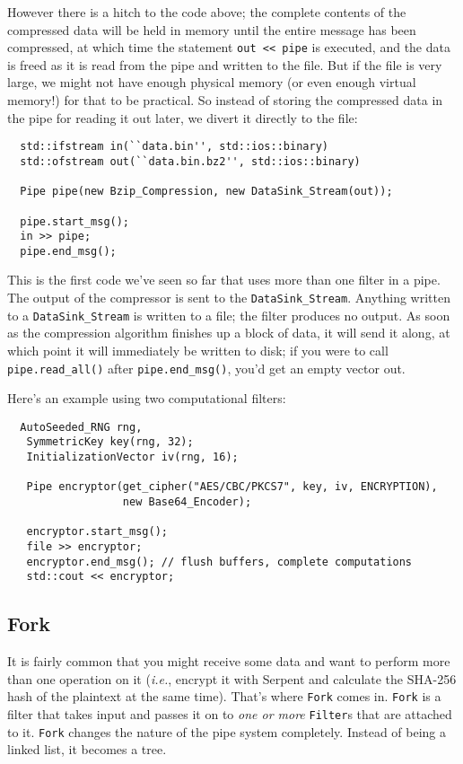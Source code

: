 \documentclass{article}
\newcommand{\type}[1]{\texttt{#1}}
\newcommand{\ie}[0]{\emph{i.e.}}
\begin{document}
However there is a hitch to the code above; the complete contents of
the compressed data will be held in memory until the entire message
has been compressed, at which time the statement \verb|out << pipe| is
executed, and the data is freed as it is read from the pipe and
written to the file. But if the file is very large, we might not have
enough physical memory (or even enough virtual memory!) for that to be
practical. So instead of storing the compressed data in the pipe for
reading it out later, we divert it directly to the file:

\begin{verbatim}
  std::ifstream in(``data.bin'', std::ios::binary)
  std::ofstream out(``data.bin.bz2'', std::ios::binary)

  Pipe pipe(new Bzip_Compression, new DataSink_Stream(out));

  pipe.start_msg();
  in >> pipe;
  pipe.end_msg();
\end{verbatim}

This is the first code we've seen so far that uses more than one
filter in a pipe. The output of the compressor is sent to the
\type{DataSink\_Stream}. Anything written to a \type{DataSink\_Stream}
is written to a file; the filter produces no output. As soon as the
compression algorithm finishes up a block of data, it will send it along,
at which point it will immediately be written to disk; if you were to
call \verb|pipe.read_all()| after \verb|pipe.end_msg()|, you'd get an
empty vector out.

Here's an example using two computational filters:

\begin{verbatim}
  AutoSeeded_RNG rng,
   SymmetricKey key(rng, 32);
   InitializationVector iv(rng, 16);

   Pipe encryptor(get_cipher("AES/CBC/PKCS7", key, iv, ENCRYPTION),
                  new Base64_Encoder);

   encryptor.start_msg();
   file >> encryptor;
   encryptor.end_msg(); // flush buffers, complete computations
   std::cout << encryptor;
\end{verbatim}

\subsection{Fork}

It is fairly common that you might receive some data and want to
perform more than one operation on it (\ie, encrypt it with Serpent
and calculate the SHA-256 hash of the plaintext at the same
time). That's where \type{Fork} comes in. \type{Fork} is a filter that
takes input and passes it on to \emph{one or more} \type{Filter}s
that are attached to it. \type{Fork} changes the nature of the pipe
system completely. Instead of being a linked list, it becomes a tree.
\end{document}

